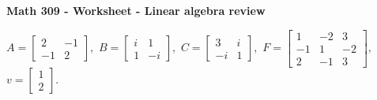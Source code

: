 \documentclass[12pt]{article}
\begin{document}
\begin{center}
\textbf{Math 309 - Worksheet - Linear algebra review} \\
\end{center}
\vspace{0.2in}


$A =\left [ 
\begin{array}{cc}
2 & -1 \\
-1 & 2
\end{array}
\right], 
$
$B =\left [ 
\begin{array}{cc}
i & 1  \\
1 & -i 
\end{array}
\right], 
$
$C =\left [ 
\begin{array}{cc}
3 & i  \\
-i & 1
\end{array}
\right], 
$
$F =\left [ 
\begin{array}{ccc}
1 & -2 & 3 \\
-1 & 1 & -2\\
2 & -1 & 3 
\end{array}
\right],
$
$v =\left [ 
\begin{array}{c}
1  \\
2 
\end{array}
\right].
$
\end{document}
